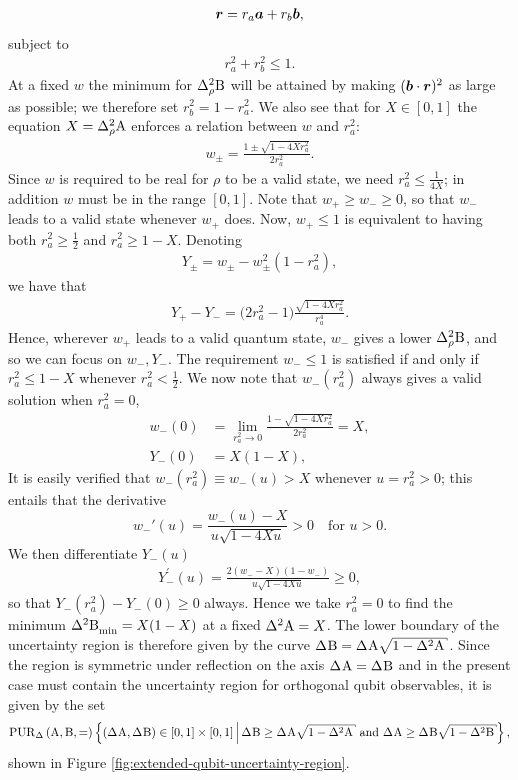\begin{align}
  \bm{r} = r_a \bm{a} + r_b \bm{b},
\end{align}
subject to
\begin{align}
  r_a^2 + r_b^2 \leq 1.
\end{align}
At a fixed $w$ the minimum for $\varr{\opb}$ will be attained by making $(\bm{b}\cdot\bm{r})^2$ as large as possible; we therefore set $r_b^2 = 1-r_a^2$. We also see that for $X\in [0,1]$ the equation $X = \varr{\opa}$ enforces a relation between $w$ and $r_a^2$: 
\begin{align}
  w_\pm = \frac{1\pm\sqrt{1 -4 X r_a^2}}{2r_a^2}.
\end{align}
Since $w$ is required to be real for $\rho$ to be a valid state, we need $r_a^2 \leq \frac{1}{4X}$; in addition $w$ must be in the range $[0,1]$. Note that  $w_+\ge w_-\ge 0$, so that $w_-$ leads to a valid state whenever $w_+$ does. Now, $w_+\le 1$ is equivalent to having both $r_a^2\ge\frac12$ and $r_a^2\ge 1-X$. Denoting
\begin{align}
  Y_\pm = w_\pm - w_\pm^2 (1-r_a^2),
\end{align}
we have that
\begin{align}
  Y_+ - Y_- =\bigl(2r_a^2-1\bigr)\frac{\sqrt{1-4 X r_a^2}}{r_a^4}.
\end{align}
Hence, wherever $w_+$ leads to a valid quantum state, $w_-$ gives a lower $\varr{\opb}$, and so we can focus on $w_-, Y_-$.
The requirement  $w_-\le 1$ is satisfied if and only if $r_a^2 \leq 1-X$ whenever $r_a^2 < \frac{1}{2}$. 
We now note that $w_-(r_a^2)$  always gives a valid solution when $r_a^2 = 0$,
\begin{align}
  w_-(0) &= \lim_{r_a^2 \to 0}  \frac{1 - \sqrt{1 -4 X r_a^2}}{2r_a^2} = X,\\
  Y_-(0) &= X(1-X),
\end{align}
It is easily verified that $w_-(r_a^2)\equiv w_-(u)>X$ whenever $u=r_a^2>0$; this entails that the derivative 
\begin{equation}\label{eq:w_->X}
w_-'(u)=\frac{w_-(u)-X}{u\sqrt{1-4Xu}}>0\quad\text{for }u>0.
\end{equation}
We then differentiate $Y_-(u)$
\begin{align}
  Y_-^\prime(u) = \frac{2(w_--X)(1-w_-)}{u\sqrt{1-4Xu}}\ge 0,
\end{align}
so that $Y_-(r_a^2) - Y_-(0)\ge 0$ always.
Hence we  take $r_a^2 = 0$ to find the minimum $\varmin{\opb}=X(1-X)$ at a fixed $\var{\opa}=X$. The lower boundary of the uncertainty region is therefore given by the curve $\sdev{\opb} = \sdev{\opa}\sqrt{1-\var{\opa}}$. Since the region is symmetric under reflection on the axis $\sdev\opa=\sdev\opb$ and in the present case must contain the uncertainty region for orthogonal qubit observables, it is given by the set
\begin{align}
  \PUR{\Delta}{\opa,\opb} = \left\{(\sdev{\opa},\sdev{\opb})\in [0,1]\times[0,1]\, \middle|\, \sdev{\opb} \geq \sdev{\opa}\sqrt{1-\var{\opa}} \text{ and } \sdev{\opa} \geq \sdev{\opb}\sqrt{1-\var{\opb}}  \right\},%
\end{align}
shown in Figure \ref{fig:extended-qubit-uncertainty-region}.

